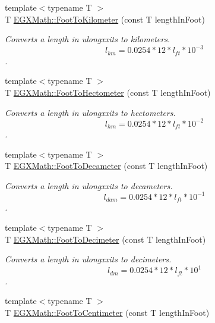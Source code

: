 \begin{DoxyCompactItemize}
{\footnotesize template$<$typename T $>$ }\\T \mbox{\hyperlink{group___e_g_x_math-_conversions-_length_conversions-_imperial-_foot-_s_i_ga7ba5eab58921ef00677d0b7db78d4daf}{E\+G\+X\+Math\+::\+Foot\+To\+Kilometer}} (const T length\+In\+Foot)
\begin{DoxyCompactList}\small\item\em Converts a length in ulongxxits to kilometers. \[ l_{km}=0.0254 * 12 * l_{ft} * 10^{-3} \]. \end{DoxyCompactList}\item 
{\footnotesize template$<$typename T $>$ }\\T \mbox{\hyperlink{group___e_g_x_math-_conversions-_length_conversions-_imperial-_foot-_s_i_ga355716f167803ca8218c845eb7df7792}{E\+G\+X\+Math\+::\+Foot\+To\+Hectometer}} (const T length\+In\+Foot)
\begin{DoxyCompactList}\small\item\em Converts a length in ulongxxits to hectometers. \[ l_{hm}=0.0254 * 12 * l_{ft} * 10^{-2} \]. \end{DoxyCompactList}\item 
{\footnotesize template$<$typename T $>$ }\\T \mbox{\hyperlink{group___e_g_x_math-_conversions-_length_conversions-_imperial-_foot-_s_i_gad602d1172e39cba2884e22630a2859a0}{E\+G\+X\+Math\+::\+Foot\+To\+Decameter}} (const T length\+In\+Foot)
\begin{DoxyCompactList}\small\item\em Converts a length in ulongxxits to decameters. \[ l_{dam}=0.0254 * 12 * l_{ft} * 10^{-1} \]. \end{DoxyCompactList}\item 
{\footnotesize template$<$typename T $>$ }\\T \mbox{\hyperlink{group___e_g_x_math-_conversions-_length_conversions-_imperial-_foot-_s_i_ga99eff28d9b367ca718238a9142b71478}{E\+G\+X\+Math\+::\+Foot\+To\+Decimeter}} (const T length\+In\+Foot)
\begin{DoxyCompactList}\small\item\em Converts a length in ulongxxits to decimeters. \[ l_{dm}=0.0254 * 12 * l_{ft} * 10^{1} \]. \end{DoxyCompactList}\item 
{\footnotesize template$<$typename T $>$ }\\T \mbox{\hyperlink{group___e_g_x_math-_conversions-_length_conversions-_imperial-_foot-_s_i_ga43e05fc21b1282adc195fe7178b2a1fc}{E\+G\+X\+Math\+::\+Foot\+To\+Centimeter}} (const T length\+In\+Foot)

\end{DoxyCompactItemize}
